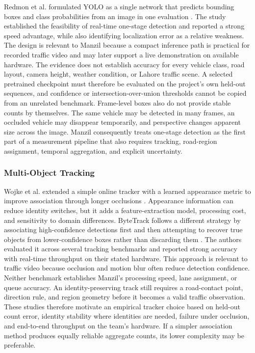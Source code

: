 Redmon et al. formulated YOLO as a single network that predicts bounding boxes and class probabilities from an image in one evaluation \cite{redmon2016yolo}. The study established the feasibility of real-time one-stage detection and reported a strong speed advantage, while also identifying localization error as a relative weakness. The design is relevant to Manzil because a compact inference path is practical for recorded traffic video and may later support a live demonstration on available hardware. The evidence does not establish accuracy for every vehicle class, road layout, camera height, weather condition, or Lahore traffic scene. A selected pretrained checkpoint must therefore be evaluated on the project's own held-out sequences, and confidence or intersection-over-union thresholds cannot be copied from an unrelated benchmark. Frame-level boxes also do not provide stable counts by themselves. The same vehicle may be detected in many frames, an occluded vehicle may disappear temporarily, and perspective changes apparent size across the image. Manzil consequently treats one-stage detection as the first part of a measurement pipeline that also requires tracking, road-region assignment, temporal aggregation, and explicit uncertainty.

\subsubsection{Multi-Object Tracking}

Wojke et al. extended a simple online tracker with a learned appearance metric to improve association through longer occlusions \cite{wojke2017deepsort}. Appearance information can reduce identity switches, but it adds a feature-extraction model, processing cost, and sensitivity to domain differences. ByteTrack follows a different strategy by associating high-confidence detections first and then attempting to recover true objects from lower-confidence boxes rather than discarding them \cite{zhang2022bytetrack}. The authors evaluated it across several tracking benchmarks and reported strong accuracy with real-time throughput on their stated hardware. This approach is relevant to traffic video because occlusion and motion blur often reduce detection confidence. Neither benchmark establishes Manzil's processing speed, lane assignment, or queue accuracy. An identity-preserving track still requires a road-contact point, direction rule, and region geometry before it becomes a valid traffic observation. These studies therefore motivate an empirical tracker choice based on held-out count error, identity stability where identities are needed, failure under occlusion, and end-to-end throughput on the team's hardware. If a simpler association method produces equally reliable aggregate counts, its lower complexity may be preferable.

